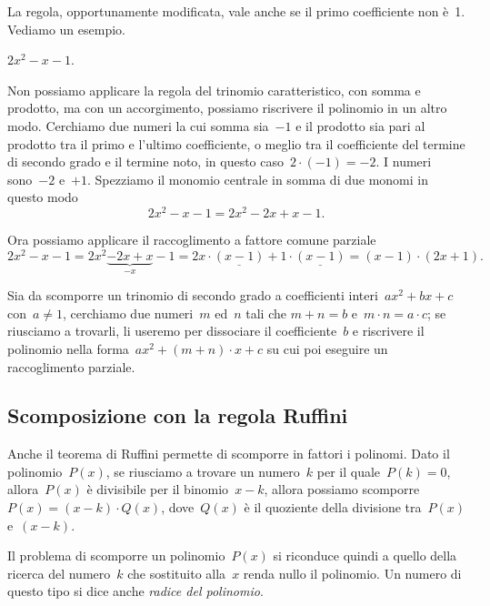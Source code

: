 La regola, opportunamente modificata, vale anche se il primo
coefficiente non è~1. Vediamo un esempio.
\begin{exrig}
 \begin{esempio}
 $2x^{2}-x-1$.

Non possiamo applicare la regola del trinomio caratteristico, con somma
e prodotto, ma con un accorgimento, possiamo riscrivere il polinomio in un
altro modo. Cerchiamo due numeri la cui somma sia~$-1$ e il prodotto sia
pari al prodotto tra il primo e l'ultimo coefficiente,
o meglio tra il coefficiente del termine di secondo grado e il termine
noto, in questo caso~$2\cdot (-1)=-2$. I numeri sono~$-2$ e~$+1$.
Spezziamo il monomio centrale in somma di due monomi in questo modo
\[2x^{2}-x-1=2x^{2}-2x+x-1.\]

Ora possiamo applicare il raccoglimento a fattore comune parziale
\[2x^{2}-x-1={2x^{2}}\underbrace{{-2x}+x}_{-x}-1=2x\cdot
\underline{(x-1)}+1\cdot
\underline{(x-1)}=\left(x-1\right)\cdot \left(2x+1\right).\]
 \end{esempio}
\end{exrig}

\begin{procedura}
Sia da scomporre un trinomio di secondo grado a coefficienti interi~$ax^{2}+bx+c$
con~$a\neq 1$, cerchiamo due numeri~$m$ ed~$n$ tali che $m+n=b$ e~$m\cdot n=a\cdot c$;
se riusciamo a trovarli, li useremo per dissociare
il coefficiente~$b$ e riscrivere il polinomio nella forma~$ax^{2}+\left(m+n\right)\cdot x+c$
su cui poi eseguire un raccoglimento parziale.
\end{procedura}

\ovalbox{\risolvii \ref{ese:13.70}, \ref{ese:13.71}, \ref{ese:13.72}, \ref{ese:13.73}, \ref{ese:13.74}, \ref{ese:13.75}, \ref{ese:13.76}, \ref{ese:13.77}, \ref{ese:13.78}, \ref{ese:13.79}}

\subsection{Scomposizione con la regola Ruffini}
Anche il teorema di Ruffini permette di scomporre in fattori i polinomi.
Dato il polinomio~$P(x)$, se riusciamo a trovare un numero~$k$
per il quale~$P(k)=0$, allora~$P(x)$ è
divisibile per il binomio~$x-k$, allora possiamo scomporre~$P(x)=(x-k)\cdot Q(x)$, dove~$Q(x)$
è il quoziente della divisione
tra~$P(x)$ e~$(x-k)$.

Il problema di scomporre un polinomio~$P(x)$ si riconduce quindi a quello
della ricerca del numero~$k$ che sostituito alla~$x$ renda nullo il
polinomio. Un numero di questo tipo si dice anche \emph{radice del polinomio}.

